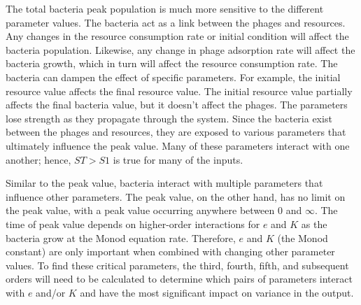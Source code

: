 The total bacteria peak population is much more sensitive to the different parameter values. 
The bacteria act as a link between the phages and resources. 
Any changes in the resource consumption rate or initial condition will affect the bacteria population. 
Likewise, any change in phage adsorption rate will affect the bacteria growth, which in turn will affect the resource consumption rate. 
The bacteria can dampen the effect of specific parameters. 
For example, the initial resource value affects the final resource value. 
The initial resource value partially affects the final bacteria value, but it doesn't affect the phages. 
The parameters lose strength as they propagate through the system. 
Since the bacteria exist between the phages and resources, they are exposed to various parameters that ultimately influence the peak value. 
Many of these parameters interact with one another; hence, $ST > S1$ is true for many of the inputs. 

Similar to the peak value, bacteria interact with multiple parameters that influence other parameters. 
The peak value, on the other hand, has no limit on the peak value, with a peak value occurring anywhere between 0 and $\infty$. 
The time of peak value depends on higher-order interactions for $e$ and $K$ as the bacteria grow at the Monod equation rate. Therefore, $e$ and $K$ (the Monod constant) are only important when combined with changing other parameter values. 
To find these critical parameters, the third, fourth, fifth, and subsequent orders will need to be calculated to determine which pairs of parameters interact with $e$ and/or $K$ and have the most significant impact on variance in the output. 

